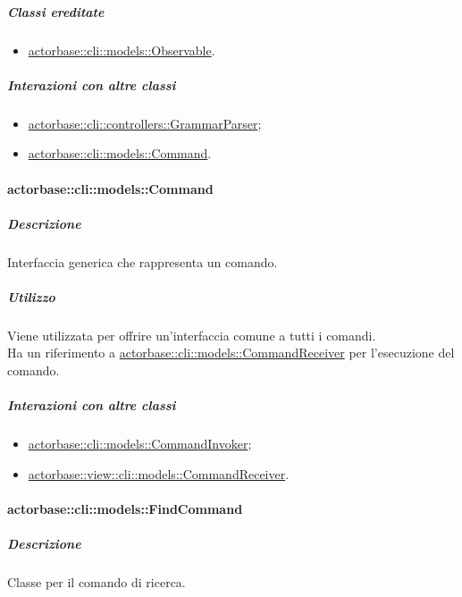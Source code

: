 \documentclass{scalatekids-article}
\begin{document}
\subparagraph{Classi ereditate}

\begin{itemize}
\item \hyperref[sec:actorbase::cli::models::Observable]{actorbase::cli::models::Observable}.
\end{itemize}

\subparagraph{Interazioni con altre classi}

\begin{itemize}
\item \hyperref[sec:actorbase::cli::controllers::GrammarParser]{actorbase::cli::controllers::GrammarParser};
\item \hyperref[sec:actorbase::cli::models::Command]{actorbase::cli::models::Command}.
\end{itemize}

\paragraph{actorbase::cli::models::Command}
\label{sec:actorbase::cli::models::Command}

\subparagraph{Descrizione}

Interfaccia generica che rappresenta un comando.

\subparagraph{Utilizzo}

Viene utilizzata per offrire un'interfaccia comune a tutti i comandi.\\Ha un
riferimento a \hyperref[sec:actorbase::cli::models::CommandReceiver]{actorbase::cli::models::CommandReceiver} per l'esecuzione del
comando.

\subparagraph{Interazioni con altre classi}

\begin{itemize}
\item \hyperref[sec:actorbase::cli::models::CommandInvoker]{actorbase::cli::models::CommandInvoker};
\item \hyperref[sec:actorbase::view::cli::models::CommandReceiver]{actorbase::view::cli::models::CommandReceiver}.
\end{itemize}

\paragraph{actorbase::cli::models::FindCommand}
\label{sec:actorbase::cli::models::FindCommand}

\subparagraph{Descrizione}

Classe per il comando di ricerca.
\end{document}
